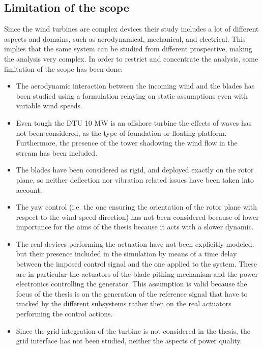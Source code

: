 \subsection{Limitation of the scope}\label{subsec:limitation_of_scope}
Since the wind turbines are complex devices their study includes a lot of different aspects and domains, such as aerodynamical, mechanical, and electrical. This implies that the same system can be studied from different prospective, making the analysis very complex. In order to restrict and concentrate the analysis, some limitation of the scope has been done:
\begin{itemize}
  \item The aerodynamic interaction between the incoming wind and the blades has been studied using a formulation relaying on static assumptions even with variable wind speeds.
  \item Even tough the DTU 10 MW is an offshore turbine the effects of waves has not been considered, as the type of foundation or floating platform. Furthermore, the presence of the tower shadowing the wind flow in the stream has been included.
  \item The blades have been considered as rigid, and deployed exactly on the rotor plane, so neither deflection nor vibration related issues have been taken into account.
  \item The yaw control (i.e. the one ensuring the orientation of the rotor plane with respect to the wind speed direction) has not been considered because of lower importance for the aims of the thesis because it acts with a slower dynamic.
  \item The real devices performing the actuation have not been explicitly modeled, but their presence included in the simulation by means of a time delay between the imposed control signal and the one applied to the system. These are in particular the actuators of the blade pithing mechanism and the power electronics controlling the generator. This assumption is valid because the focus of the thesis is on the generation of the reference signal that have to tracked by the different subsystems rather then on the real actuators performing the control actions.
  \item Since the grid integration of the turbine is not considered in the thesis, the grid interface has not been studied, neither the aspects of power quality.    
\end{itemize}